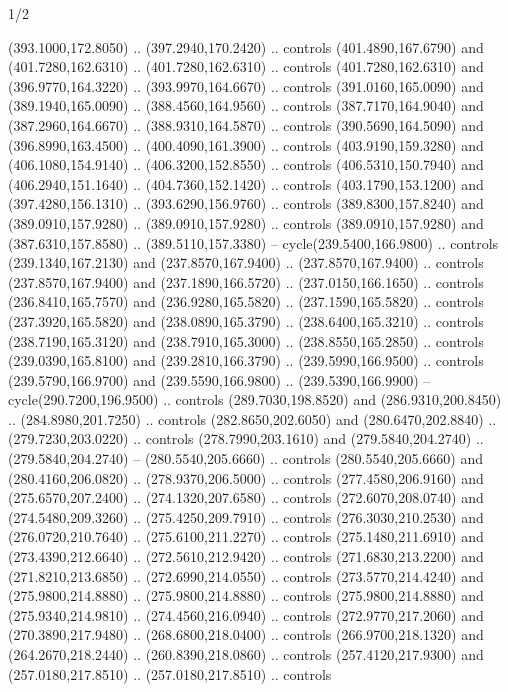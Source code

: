 \begin{flagdescription}{1/2}
\begin{scope}[xshift=0.5\flaglength]
\begin{scope}[scale=0.004\flagwidth,xshift=-90mm,yshift=89mm]
\begin{scope}[y=0.80pt, x=0.80pt, yscale=-1, xscale=1, inner sep=0pt, outer sep=0pt]
  (393.1000,172.8050) .. (397.2940,170.2420) .. controls (401.4890,167.6790) and
  (401.7280,162.6310) .. (401.7280,162.6310) .. controls (401.7280,162.6310) and
  (396.9770,164.3220) .. (393.9970,164.6670) .. controls (391.0160,165.0090) and
  (389.1940,165.0090) .. (388.4560,164.9560) .. controls (387.7170,164.9040) and
  (387.2960,164.6670) .. (388.9310,164.5870) .. controls (390.5690,164.5090) and
  (396.8990,163.4500) .. (400.4090,161.3900) .. controls (403.9190,159.3280) and
  (406.1080,154.9140) .. (406.3200,152.8550) .. controls (406.5310,150.7940) and
  (406.2940,151.1640) .. (404.7360,152.1420) .. controls (403.1790,153.1200) and
  (397.4280,156.1310) .. (393.6290,156.9760) .. controls (389.8300,157.8240) and
  (389.0910,157.9280) .. (389.0910,157.9280) .. controls (389.0910,157.9280) and
  (387.6310,157.8580) .. (389.5110,157.3380) -- cycle(239.5400,166.9800) ..
  controls (239.1340,167.2130) and (237.8570,167.9400) .. (237.8570,167.9400) ..
  controls (237.8570,167.9400) and (237.1890,166.5720) .. (237.0150,166.1650) ..
  controls (236.8410,165.7570) and (236.9280,165.5820) .. (237.1590,165.5820) ..
  controls (237.3920,165.5820) and (238.0890,165.3790) .. (238.6400,165.3210) ..
  controls (238.7190,165.3120) and (238.7910,165.3000) .. (238.8550,165.2850) ..
  controls (239.0390,165.8100) and (239.2810,166.3790) .. (239.5990,166.9500) ..
  controls (239.5790,166.9700) and (239.5590,166.9800) .. (239.5390,166.9900) --
  cycle(290.7200,196.9500) .. controls (289.7030,198.8520) and
  (286.9310,200.8450) .. (284.8980,201.7250) .. controls (282.8650,202.6050) and
  (280.6470,202.8840) .. (279.7230,203.0220) .. controls (278.7990,203.1610) and
  (279.5840,204.2740) .. (279.5840,204.2740) -- (280.5540,205.6660) .. controls
  (280.5540,205.6660) and (280.4160,206.0820) .. (278.9370,206.5000) .. controls
  (277.4580,206.9160) and (275.6570,207.2400) .. (274.1320,207.6580) .. controls
  (272.6070,208.0740) and (274.5480,209.3260) .. (275.4250,209.7910) .. controls
  (276.3030,210.2530) and (276.0720,210.7640) .. (275.6100,211.2270) .. controls
  (275.1480,211.6910) and (273.4390,212.6640) .. (272.5610,212.9420) .. controls
  (271.6830,213.2200) and (271.8210,213.6850) .. (272.6990,214.0550) .. controls
  (273.5770,214.4240) and (275.9800,214.8880) .. (275.9800,214.8880) .. controls
  (275.9800,214.8880) and (275.9340,214.9810) .. (274.4560,216.0940) .. controls
  (272.9770,217.2060) and (270.3890,217.9480) .. (268.6800,218.0400) .. controls
  (266.9700,218.1320) and (264.2670,218.2440) .. (260.8390,218.0860) .. controls
  (257.4120,217.9300) and (257.0180,217.8510) .. (257.0180,217.8510) .. controls

\end{scope}
\end{scope}
\end{scope}
\end{flagdescription}
